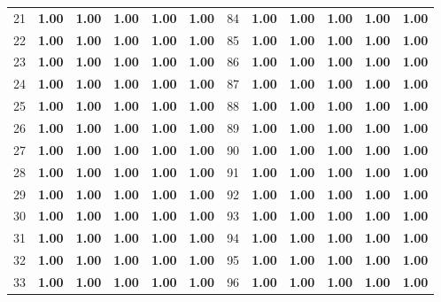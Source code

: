 \documentclass{article}
\begin{document}
{\begin{longtable}{cccccc@{\qquad}cccccc}
21 & \textbf{1.00} & \textbf{1.00} & \textbf{1.00} & \textbf{1.00} & \textbf{1.00} & 84 & \textbf{1.00} & \textbf{1.00} & \textbf{1.00} & \textbf{1.00} & \textbf{1.00} \\
22 & \textbf{1.00} & \textbf{1.00} & \textbf{1.00} & \textbf{1.00} & \textbf{1.00} & 85 & \textbf{1.00} & \textbf{1.00} & \textbf{1.00} & \textbf{1.00} & \textbf{1.00} \\
23 & \textbf{1.00} & \textbf{1.00} & \textbf{1.00} & \textbf{1.00} & \textbf{1.00} & 86 & \textbf{1.00} & \textbf{1.00} & \textbf{1.00} & \textbf{1.00} & \textbf{1.00} \\
24 & \textbf{1.00} & \textbf{1.00} & \textbf{1.00} & \textbf{1.00} & \textbf{1.00} & 87 & \textbf{1.00} & \textbf{1.00} & \textbf{1.00} & \textbf{1.00} & \textbf{1.00} \\
25 & \textbf{1.00} & \textbf{1.00} & \textbf{1.00} & \textbf{1.00} & \textbf{1.00} & 88 & \textbf{1.00} & \textbf{1.00} & \textbf{1.00} & \textbf{1.00} & \textbf{1.00} \\
26 & \textbf{1.00} & \textbf{1.00} & \textbf{1.00} & \textbf{1.00} & \textbf{1.00} & 89 & \textbf{1.00} & \textbf{1.00} & \textbf{1.00} & \textbf{1.00} & \textbf{1.00} \\
27 & \textbf{1.00} & \textbf{1.00} & \textbf{1.00} & \textbf{1.00} & \textbf{1.00} & 90 & \textbf{1.00} & \textbf{1.00} & \textbf{1.00} & \textbf{1.00} & \textbf{1.00} \\
28 & \textbf{1.00} & \textbf{1.00} & \textbf{1.00} & \textbf{1.00} & \textbf{1.00} & 91 & \textbf{1.00} & \textbf{1.00} & \textbf{1.00} & \textbf{1.00} & \textbf{1.00} \\
29 & \textbf{1.00} & \textbf{1.00} & \textbf{1.00} & \textbf{1.00} & \textbf{1.00} & 92 & \textbf{1.00} & \textbf{1.00} & \textbf{1.00} & \textbf{1.00} & \textbf{1.00} \\
30 & \textbf{1.00} & \textbf{1.00} & \textbf{1.00} & \textbf{1.00} & \textbf{1.00} & 93 & \textbf{1.00} & \textbf{1.00} & \textbf{1.00} & \textbf{1.00} & \textbf{1.00} \\
31 & \textbf{1.00} & \textbf{1.00} & \textbf{1.00} & \textbf{1.00} & \textbf{1.00} & 94 & \textbf{1.00} & \textbf{1.00} & \textbf{1.00} & \textbf{1.00} & \textbf{1.00} \\
32 & \textbf{1.00} & \textbf{1.00} & \textbf{1.00} & \textbf{1.00} & \textbf{1.00} & 95 & \textbf{1.00} & \textbf{1.00} & \textbf{1.00} & \textbf{1.00} & \textbf{1.00} \\
33 & \textbf{1.00} & \textbf{1.00} & \textbf{1.00} & \textbf{1.00} & \textbf{1.00} & 96 & \textbf{1.00} & \textbf{1.00} & \textbf{1.00} & \textbf{1.00} & \textbf{1.00} \\

\end{longtable}}
\end{document}
